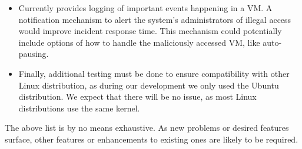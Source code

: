 \begin{itemize}
\item Currently  provides logging of important events happening in a \ac{VM}. A notification mechanism to alert the system's administrators of illegal access would improve incident response time. This mechanism could potentially include options of how to handle the maliciously accessed \ac{VM}, like auto-pausing.

\item Finally, additional testing must be done to ensure compatibility with other Linux distribution, as during our development we only used the Ubuntu distribution. We expect that there will be no issue, as most Linux distributions use the same kernel.


\end{itemize}

\par The above list is by no means exhaustive. As new problems or desired features surface, other features or enhancements to existing ones are likely to be required. 



